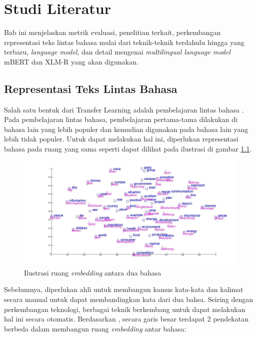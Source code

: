 \chapter{Studi Literatur}

Bab ini menjelaskan metrik evaluasi, penelitian terkait, perkembangan representasi teks lintas bahasa mulai dari teknik-teknik terdahulu hingga yang terbaru, \textit{language model}, dan detail mengenai \textit{multilingual language model} mBERT dan XLM-R yang akan digunakan. 

\section{Representasi Teks Lintas Bahasa}
    Salah satu bentuk dari Transfer Learning adalah pembelajaran lintas bahasa \parencite{ruder2019transfer}. Pada pembelajaran lintas bahasa, pembelajaran pertama-tama dilakukan di bahasa lain yang lebih populer dan kemudian digunakan pada bahasa lain yang lebih tidak populer. Untuk dapat melakukan hal ini, diperlukan representasi bahasa pada ruang yang sama seperti dapat dilihat pada ilustrasi di gambar \ref{fig:ilustrasi_embedding}.

    \begin{figure}[ht]
        \centering
        \includegraphics[width=1\textwidth]{resources/luong_et_al_2015.jpg}
        \caption{Ilustrasi ruang \textit{embedding} antara dua bahasa \parencite{Luong_Pham_Manning_2015}}
        \label{fig:ilustrasi_embedding}
    \end{figure}

    Sebelumnya, diperlukan ahli untuk membangun kamus kata-kata dan kalimat secara manual untuk dapat membandingkan kata dari dua bahsa. Seiring dengan perkembangan teknologi, berbagai teknik berkembang untuk dapat melakukan hal ini secara otomatis. Berdasarkan \parencite{Wang_Xie_Xu_Yang_Neubig_Carbonell_2019}, secara garis besar terdapat 2 pendekatan berbeda dalam membangun ruang \textit{embedding} antar bahasa:

